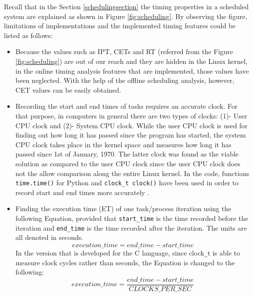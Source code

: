 Recall that in the Section \ref{schedulingsection} the timing properties in a scheduled system are explained as shown in Figure \ref{fig:scheduling}. By observing the figure, limitations of implementations and the implemented timing features could be listed as follows:
\begin{itemize}
	\item Because the values such as IPT, CETs and RT (referred from the Figure \ref{fig:scheduling}) are out of our reach and they are hidden in the Linux kernel, in the online timing analysis features that are implemented, those values have been neglected. With the help of the offline scheduling analysis, however, CET values can be easily obtained.
	\item Recording the start and end times of tasks requires an accurate clock. For that purpose, in computers in general there are two types of clocks: (1)- User CPU clock and (2)- System CPU clock. While the user CPU clock is used for finding out how long it has passed since the program has started, the system CPU clock takes place in the kernel space and measures how long it has passed since 1st of January, 1970. The latter clock was found as the viable solution as compared to the user CPU clock since the user CPU clock does not the allow comparison along the entire Linux kernel. In the code, functions \texttt{time.time()} for Python and \texttt{clock\texttt{\_}t clock()} have been used in order to record start and end times more accurately \cite{cpuandusertimes} \cite{cpuandusertimes2}.
	\item Finding the execution time (ET) of one task/process iteration using the following Equation, provided that \texttt{start\texttt{\_}time} is the time recorded before the iteration and \texttt{end\texttt{\_}time} is the time recorded after the iteration. The units are all denoted in seconds.
	\begin{equation}
	execution\texttt{\_}time=end\texttt{\_}time - start\texttt{\_}time
	\end{equation}
	In the version that is developed for the C language, since clock\texttt{\_}t is able to measure clock cycles rather than seconds, the Equation is changed to the following:
	\begin{equation}
	execution\texttt{\_}time=\frac{end\texttt{\_}time - start\texttt{\_}time} {CLOCKS\texttt{\_}PER\texttt{\_}SEC}
	\end{equation}
	

\end{itemize}
